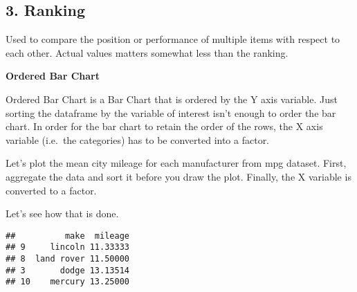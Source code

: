 \documentclass[a4paper]{article}
\newenvironment{Shaded}{\begin{snugshade}}{\end{snugshade}}
\newcommand{\KeywordTok}[1]{\textcolor[rgb]{0.13,0.29,0.53}{\textbf{#1}}}
\newcommand{\DataTypeTok}[1]{\textcolor[rgb]{0.13,0.29,0.53}{#1}}
\newcommand{\DecValTok}[1]{\textcolor[rgb]{0.00,0.00,0.81}{#1}}
\newcommand{\StringTok}[1]{\textcolor[rgb]{0.31,0.60,0.02}{#1}}
\newcommand{\CommentTok}[1]{\textcolor[rgb]{0.56,0.35,0.01}{\textit{#1}}}
\newcommand{\OperatorTok}[1]{\textcolor[rgb]{0.81,0.36,0.00}{\textbf{#1}}}
\newcommand{\NormalTok}[1]{#1}
\begin{document}
\newpage

\subsection{3. Ranking}\label{ranking}

Used to compare the position or performance of multiple items with
respect to each other. Actual values matters somewhat less than the
ranking.

\textbf{Ordered Bar Chart}

Ordered Bar Chart is a Bar Chart that is ordered by the Y axis variable.
Just sorting the dataframe by the variable of interest isn't enough to
order the bar chart. In order for the bar chart to retain the order of
the rows, the X axis variable (i.e.~the categories) has to be converted
into a factor.

Let's plot the mean city mileage for each manufacturer from mpg dataset.
First, aggregate the data and sort it before you draw the plot. Finally,
the X variable is converted to a factor.

Let's see how that is done.

\begin{Shaded}
\end{Shaded}

\begin{verbatim}
##          make  mileage
## 9     lincoln 11.33333
## 8  land rover 11.50000
## 3       dodge 13.13514
## 10    mercury 13.25000
\end{verbatim}
\end{document}
